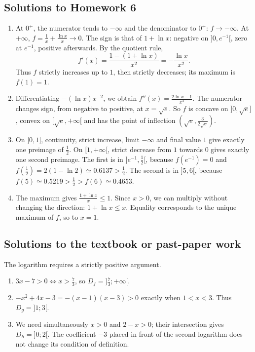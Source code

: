 \subsection{Solutions to Homework 6}\begin{enumerate}
\item At $0^+$, the numerator tends to $-\infty$ and the denominator to $0^+$: $f\to-\infty$. At $+\infty$, $f=\frac{1}{x}+\frac{\ln x}{x}\to0$. The sign is that of $1+\ln x$: negative on $]0,e^{-1}[$, zero at $e^{-1}$, positive afterwards. By the quotient rule,
\[f'(x)=\frac{1-(1+\ln x)}{x^2}=-\frac{\ln x}{x^2}.\]
Thus $f$ strictly increases up to $1$, then strictly decreases; its maximum is $f(1)=1$.
\item Differentiating $-(\ln x)x^{-2}$, we obtain $f''(x)=\frac{2\ln x-1}{x^3}$. The numerator changes sign, from negative to positive, at $x=\sqrt e$. So $f$ is concave on $]0,\sqrt e]$, convex on $[\sqrt e,+\infty[$ and has the point of inflection $(\sqrt{e},\frac{3}{2\sqrt e})$.
\item On $]0,1]$, continuity, strict increase, limit $-\infty$ and final value $1$ give exactly one preimage of $\frac{1}{2}$. On $[1,+\infty[$, strict decrease from $1$ towards $0$ gives exactly one second preimage. The first is in $]e^{-1},\frac{1}{2}[$, because $f(e^{-1})=0$ and $f(\frac{1}{2})=2(1-\ln2)\simeq0.6137>\frac{1}{2}$. The second is in $]5,6[$, because $f(5)\simeq0.5219>\frac{1}{2}>f(6)\simeq0.4653$.
\item The maximum gives $\frac{1+\ln x}{x}\le1$. Since $x>0$, we can multiply without changing the direction: $1+\ln x\le x$. Equality corresponds to the unique maximum of $f$, so to $x=1$.
\end{enumerate}

\subsection{Solutions to the textbook or past-paper work}The logarithm requires a strictly positive argument.
\begin{enumerate}
\item $3x-7>0\Longleftrightarrow x>\frac73$, so $D_f=]\frac73;+\infty[$.
\item $-x^2+4x-3=-(x-1)(x-3)>0$ exactly when $1<x<3$. Thus $D_g=]1;3[$.
\item We need simultaneously $x>0$ and $2-x>0$; their intersection gives $D_h=]0;2[$. The coefficient $-3$ placed in front of the second logarithm does not change its condition of definition.
\end{enumerate}

\fi

